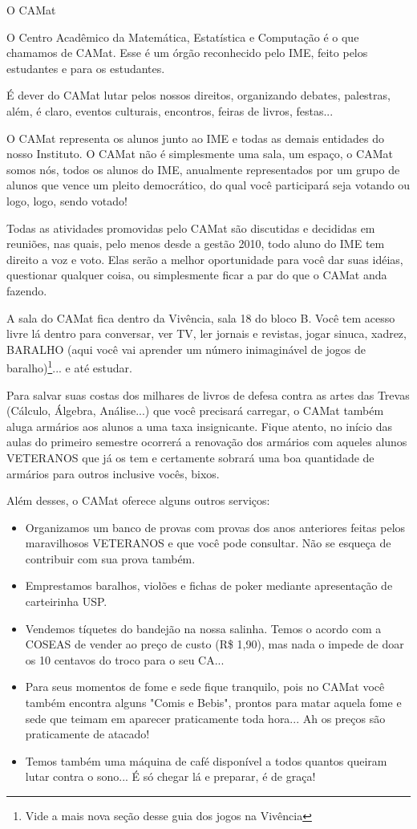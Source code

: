 \begin{secao}{O CAMat}

O Centro Acadêmico da Matemática, Estatística e Computação é o que chamamos de CAMat. Esse é um órgão reconhecido pelo IME, feito pelos estudantes e para os estudantes.
 
É dever do CAMat lutar pelos nossos direitos, organizando debates, palestras, além, é claro, eventos culturais, encontros, feiras de livros, festas...
 
O CAMat representa os alunos junto ao IME e todas as demais entidades do nosso Instituto. O CAMat não é simplesmente uma sala, um espaço, o CAMat somos nós, todos os alunos do IME, anualmente representados por um grupo de alunos que vence um pleito democrático, do qual você participará seja votando ou logo, logo, sendo votado!

Todas as atividades promovidas pelo CAMat são discutidas e decididas em reuniões, nas quais, pelo menos desde a gestão 2010, todo aluno do IME tem direito a voz e voto. Elas serão a melhor oportunidade para você dar suas idéias, questionar qualquer coisa,
ou simplesmente ficar a par do que o CAMat anda fazendo. 
 
A sala do CAMat  fica dentro da Vivência, sala 18 do bloco B. Você tem acesso livre lá
dentro para conversar, ver TV, ler jornais e revistas, jogar sinuca, xadrez, BARALHO
(aqui você vai aprender um número inimaginável de jogos de baralho)\footnote{Vide a mais nova seção desse guia dos jogos na Vivência}... e até estudar.
 

Para salvar suas costas dos milhares de livros de defesa contra as artes das Trevas
(Cálculo, Álgebra, Análise...) que você precisará carregar, o CAMat também aluga
armários aos alunos a uma taxa insignicante. Fique atento, no início das aulas do primeiro semestre ocorrerá a renovação dos armários com aqueles alunos VETERANOS que já os tem e certamente sobrará uma boa quantidade de armários para outros inclusive vocês, bixos.
 
Além desses, o CAMat oferece alguns outros serviços:

\begin{itemize}
\item Organizamos um banco de provas com provas dos anos anteriores feitas pelos
maravilhosos VETERANOS e que você pode consultar. Não se esqueça de contribuir com sua prova também.
\item Emprestamos baralhos, violões e fichas de poker mediante apresentação de carteirinha USP.
\item Vendemos tíquetes do bandejão na nossa salinha. Temos o acordo com a COSEAS de vender ao preço de custo (R\$ 1,90), mas nada o impede de doar os 10 centavos do troco para o seu CA...
\item Para seus momentos de fome e sede fique tranquilo, pois no CAMat você também encontra alguns "Comis e Bebis", prontos para matar aquela fome e sede que teimam em aparecer praticamente toda hora... Ah os preços são praticamente de atacado!
\item Temos também uma máquina de café disponível a todos quantos queiram lutar contra o sono... É só chegar lá e preparar, é de graça!
\end{itemize}


\end{secao}
